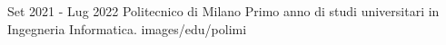{Set 2021 - Lug 2022}
{Politecnico di Milano}
{Primo anno di studi universitari in Ingegneria Informatica.}
{images/edu/polimi}
